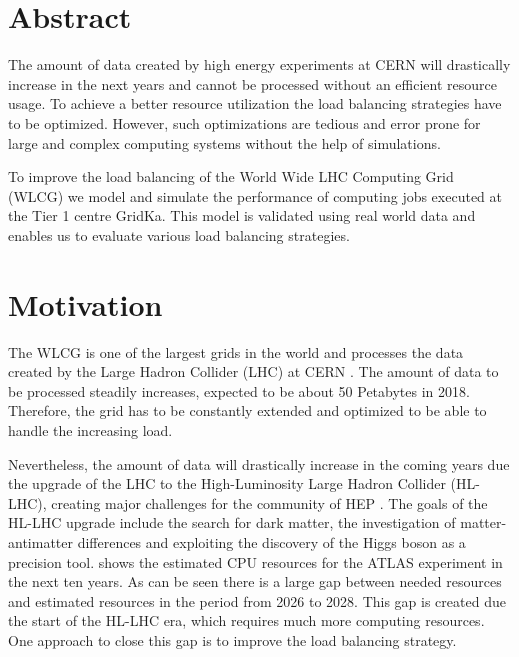 \chapter{Abstract}
The amount of data created by high energy experiments at CERN will drastically increase in the next years and cannot be processed without an efficient resource usage.
To achieve a better resource utilization the load balancing strategies have to be optimized.
However, such optimizations are tedious and error prone for large and complex computing systems without the help of simulations.

To improve the load balancing of the World Wide LHC Computing Grid (WLCG) we model and simulate the performance of computing jobs executed at the Tier 1 centre GridKa.
This model is validated using real world data and enables us to evaluate various load balancing strategies.


\chapter{Motivation}
The WLCG is one of the largest grids in the world and processes the data created by the Large Hadron Collider (LHC) at CERN \cite{wlcg_update}. 
The amount of data to be processed steadily increases, expected to be about 50 Petabytes in 2018. Therefore, the grid has to be constantly extended and optimized to be able to handle the increasing load.

Nevertheless, the amount of data will drastically increase in the coming years due the upgrade of the LHC to the High-Luminosity Large Hadron Collider (HL-LHC), creating major challenges for the community of HEP \cite{community}.
The goals of the HL-LHC upgrade include the search for dark matter, the investigation of matter-antimatter differences and exploiting the discovery of the Higgs boson as a precision tool.
 shows the estimated CPU resources for the ATLAS experiment in the next ten years. As can be seen there is a large gap between needed resources and estimated resources in the period from 2026 to 2028. This gap is created due the start of the HL-LHC era, which requires much more computing resources. One approach to close this gap is to improve the load balancing strategy. 

